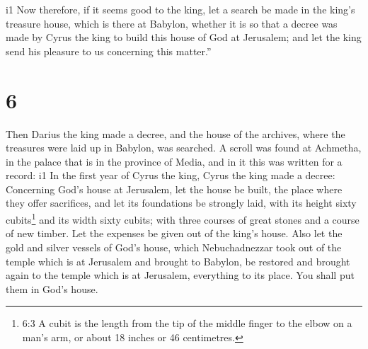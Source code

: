 i1 Now therefore, if it seems good to the king, let a
search be made in the king's treasure house, which is there at Babylon,
whether it is so that a decree was made by Cyrus the king to build this
house of God at Jerusalem; and let the king send his pleasure to us
concerning this matter.''

\hypertarget{section-5}{%
\section{6}\label{section-5}}

 Then Darius the king made a decree, and the house of the
archives, where the treasures were laid up in Babylon, was searched.
 A scroll was found at Achmetha, in the palace that is in
the province of Media, and in it this was written for a record:
i1 In the first year of Cyrus the king, Cyrus the king made
a decree: Concerning God's house at Jerusalem, let the house be built,
the place where they offer sacrifices, and let its foundations be
strongly laid, with its height sixty cubits\footnote{6:3 A cubit is the
  length from the tip of the middle finger to the elbow on a man's arm,
  or about 18 inches or 46 centimetres.} and its width sixty cubits;
 with three courses of great stones and a course of new
timber. Let the expenses be given out of the king's house. 
Also let the gold and silver vessels of God's house, which
Nebuchadnezzar took out of the temple which is at Jerusalem and brought
to Babylon, be restored and brought again to the temple which is at
Jerusalem, everything to its place. You shall put them in God's house.

